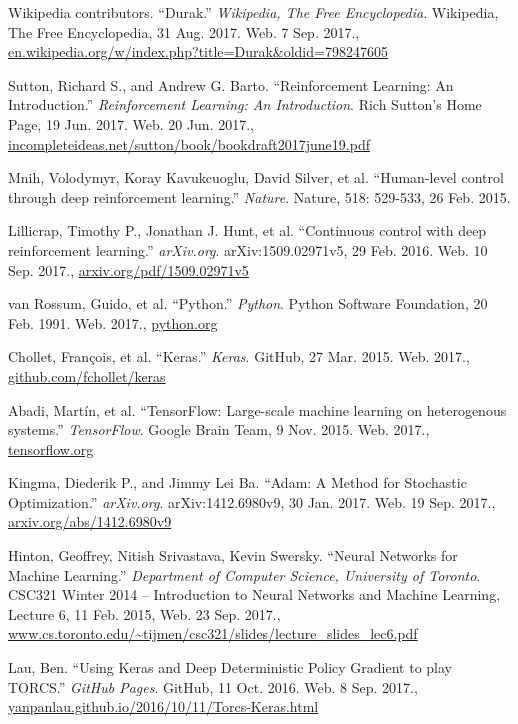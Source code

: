 \documentclass[a4paper,titlepage]{article}
\begin{document}
\begin{thebibliography}{9}

  Wikipedia contributors. ``Durak.'' \emph{Wikipedia, The Free Encyclopedia}. Wikipedia, The Free Encyclopedia, 31 Aug. 2017. Web.
  7 Sep. 2017., \\
  \url{en.wikipedia.org/w/index.php?title=Durak&oldid=798247605}

  Sutton, Richard S., and Andrew G. Barto. ``Reinforcement Learning: An Introduction.'' \emph{Reinforcement Learning: An Introduction}. Rich Sutton's Home Page, 19 Jun. 2017. Web.
  20 Jun. 2017.,
  \url{incompleteideas.net/sutton/book/bookdraft2017june19.pdf}

  Mnih, Volodymyr, Koray Kavukcuoglu, David Silver, et al. ``Human-level control through deep reinforcement learning.'' \emph{Nature}. Nature, 518: 529-533, 26 Feb. 2015.

  Lillicrap, Timothy P., Jonathan J. Hunt, et al. ``Continuous control with deep reinforcement learning.'' \emph{arXiv.org}. arXiv:1509.02971v5, 29 Feb. 2016. Web.
  10 Sep. 2017.,
  \url{arxiv.org/pdf/1509.02971v5}

  van Rossum, Guido, et al. ``Python.'' \emph{Python}. Python Software Foundation, 20 Feb. 1991. Web.
  2017.,
  \url{python.org}

  Chollet, Fran\c{c}ois, et al. ``Keras.'' \emph{Keras}. GitHub, 27 Mar. 2015. Web.
  2017.,
  \url{github.com/fchollet/keras}

  Abadi, Martín, et al. ``TensorFlow: Large-scale machine learning on heterogenous systems.'' \emph{TensorFlow}. Google Brain Team, 9 Nov. 2015. Web.
  2017.,
  \url{tensorflow.org}

  Kingma, Diederik P., and Jimmy Lei Ba. ``Adam: A Method for Stochastic Optimization.'' \emph{arXiv.org}. arXiv:1412.6980v9, 30 Jan. 2017. Web.
  19 Sep. 2017.,
  \url{arxiv.org/abs/1412.6980v9}

  Hinton, Geoffrey, Nitish Srivastava, Kevin Swersky. ``Neural Networks for Machine Learning.'' \emph{Department of Computer Science, University of Toronto}. CSC321 Winter 2014 -- Introduction to Neural Networks and Machine Learning, Lecture 6, 11 Feb. 2015, Web. 23 Sep. 2017.,
  \url{www.cs.toronto.edu/~tijmen/csc321/slides/lecture_slides_lec6.pdf}

  Lau, Ben. ``Using Keras and Deep Deterministic Policy Gradient to play TORCS.'' \emph{GitHub Pages}. GitHub, 11 Oct. 2016. Web.
  8 Sep. 2017.,
  \url{yanpanlau.github.io/2016/10/11/Torcs-Keras.html}

\end{thebibliography}
\end{document}
